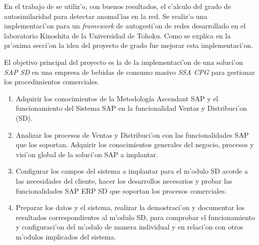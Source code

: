 En el trabajo de \cite{mingliddos} se utiliz'o, con buenos resultados, el
c'alculo del grado de autosimilaridad para detectar anomal'ias en la red. Se
realiz'o una implementaci'on para un {\it framework} de autogesti'on de redes
desarrollado en el laboratorio Kinoshita de la Universidad de Tohoku. Como se
explica en la pr'oxima secci'on la idea del proyecto de grado fue mejorar esta
implementaci'on.

\vspace{5 mm}

\label{sect:objetivo_general}
\vspace{5 mm}

\indent El objetivo principal del proyecto es la de la implementaci'on de una soluci'on \emph{SAP SD} en una empresa de bebidas de consumo masivo \emph{SSA CPG} para gestionar los procedimientos comerciales. 


\vspace{5 mm}

\label{sect:objetivos_especificos}
\vspace{5 mm}

\begin{enumerate}
\item Adquirir los conocimientos de la Metodología Ascendant SAP y el funcionamiento del Sistema SAP en la funcionalidad Ventas y Distribuci'on (SD).

\item Analizar los procesos de Ventas y Distribuci'on con las funcionalidades SAP que los soportan. Adquirir los conocimientos generales del negocio, procesos y visi'on global de la soluci'on SAP a implantar.

\item Configurar los campos del sistema a implantar para el m'odulo SD acorde a las necesidades del cliente, hacer los desarrollos necesarios y probar las funcionalidades SAP ERP SD que soportan los procesos comerciales.

\item Preparar los datos y el sistema, realizar la demostraci'on y documentar los resultados correspondientes al m'odulo SD, para comprobar el funcionamiento y configuraci'on del m'odulo de manera individual y en relaci'on con otros m'odulos implicados del sistema.

\end{enumerate}

